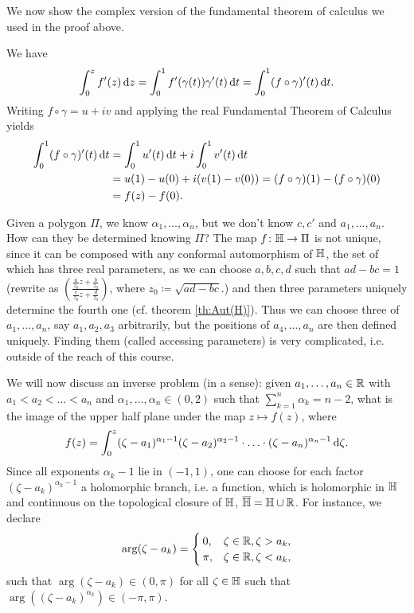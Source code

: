 \documentclass[a4paper,english]{article}
\begin{document}
We now show the complex version of the fundamental theorem of calculus we used in the proof above.
\begin{pr}
    We have
    \begin{equation*}
        \int_{0}^{z} f'(z) \mathop{}\!\mathrm{d}{z}
        = \int_{0}^{1} f'(\gamma(t)) \gamma'(t) \mathop{}\!\mathrm{d}{t}
        = \int_{0}^{1} (f \circ \gamma)'(t) \mathop{}\!\mathrm{d}{t}.
    \end{equation*}
    Writing $f \circ \gamma = u + i v$ and applying the real Fundamental Theorem of Calculus yields
    \begin{align*}
        \int_{0}^{1} (f \circ \gamma)'(t) \mathop{}\!\mathrm{d}{t}
        & = \int_{0}^{1} u'(t) \mathop{}\!\mathrm{d}{t} + i \int_{0}^{1} v'(t) \mathop{}\!\mathrm{d}{t} \\
        & = u(1) - u(0) + i (v(1) - v(0)) 
        = (f \circ \gamma)(1) - (f \circ \gamma)(0) \\
        & = f(z) - f(0).
    \end{align*}
\end{pr}

Given a polygon $\Pi$, we know $\alpha_1, \ldots, \alpha_n$, but we don't know $c, c'$ and $a_1, \ldots, a_n$.
How can they be determined knowing $\Pi$?
The map $f \colon \mathbb{H} \to \Pi$ is not unique, since it can be composed with any conformal automorphism of $\mathbb{H}$, the set of which has three real parameters, as we can choose $a,b,c,d$ such that $a d - b c = 1$ (rewrite as $\left( \frac{\frac{a}{z_0} z + \frac{b}{z_0}}{\frac{c}{z_0} z + \frac{d}{z_0}}\right)$, where $z_0 \coloneqq \sqrt{a d - b c}$.) and then three parameters uniquely determine the fourth one (cf. theorem \ref{th:Aut(H)}).
Thus we can choose three of $a_1, \ldots, a_n$, say $a_1, a_2, a_3$ arbitrarily, but the positions of $a_4, \ldots, a_n$ are then defined uniquely.
Finding them (called accessing parameters) is very complicated, i.e. outside of the reach of this course.

We will now discuss an inverse problem (in a sense): given $a_1, \ldots, a_n \in \operatorname{\mathbb{R}}$ with $a_1 < a_2 < \ldots < a_n$ and $\alpha_1, \ldots, \alpha_n \in (0, 2)$ such that $\sum_{k = 1}^{n} \alpha_k = n - 2$, what is the image of the upper half plane under the map $z \mapsto f(z)$, where
\begin{equation} \label{eq:trad}
    f(z)
    = \int_{0}^{z} (\zeta - a_1)^{\alpha_1 - 1} (\zeta - a_2)^{\alpha_2 - 1} \cdot \ldots \cdot (\zeta - a_n)^{\alpha_n - 1} \mathop{}\!\mathrm{d}{\zeta}.
\end{equation}
Since all exponents $\alpha_k - 1$ lie in $(-1, 1)$, one can choose for each factor $(\zeta - a_k)^{\alpha_k - 1}$ a holomorphic branch, i.e. a function, which is holomorphic in $\mathbb{H}$ and continuous on the topological closure of $\mathbb{H}$, $\overline{\mathbb{H}} = \mathbb{H} \cup \operatorname{\mathbb{R}}$.
For instance, we declare
\begin{equation*}
    \arg(\zeta - a_k)
    = \begin{cases}
        0,      & \zeta \in \operatorname{\mathbb{R}}, \zeta > a_k, \\
        \pi,    & \zeta \in \operatorname{\mathbb{R}}, \zeta < a_k,
    \end{cases}
\end{equation*}
such that $\arg(\zeta - a_k) \in (0, \pi)$ for all $\zeta \in \mathbb{H}$ such that $\arg((\zeta - a_k)^{\alpha_k}) \in (- \pi, \pi)$.
\end{document}
